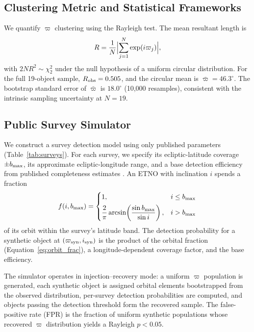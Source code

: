 \documentclass[12pt,a4paper]{article}
\begin{document}
\subsection{Clustering Metric and Statistical Frameworks}

We quantify $\varpi$ clustering using the Rayleigh test. The mean resultant length is
\begin{equation}
R = \frac{1}{N}\Bigl|\sum_{j=1}^{N} \exp(i\varpi_j)\Bigr|,
\label{eq:rayleigh}
\end{equation}
with $2NR^{2} \sim \chi^{2}_{2}$ under the null hypothesis of a uniform circular distribution. For the full 19-object sample, $R_{\rm obs} = 0.505$, and the circular mean is $\bar{\varpi} = 46.3^\circ$. The bootstrap standard error of $\bar{\varpi}$ is $18.0^\circ$ (10,000 resamples), consistent with the intrinsic sampling uncertainty at $N=19$.

\subsection{Public Survey Simulator}

We construct a survey detection model using only published parameters (Table~\ref{tab:surveys}). For each survey, we specify its ecliptic-latitude coverage $\pm b_{\rm max}$, its approximate ecliptic-longitude range, and a base detection efficiency from published completeness estimates \cite{shankman2017,napier2021}. An ETNO with inclination $i$ spends a fraction
\begin{equation}
f(i, b_{\rm max}) = \begin{cases}
1, & i \leq b_{\rm max} \\[4pt]
\displaystyle\frac{2}{\pi}\arcsin\!\left(\frac{\sin b_{\rm max}}{\sin i}\right), & i > b_{\rm max}
\end{cases}
\label{eq:orbit_frac}
\end{equation}
of its orbit within the survey's latitude band. The detection probability for a synthetic object at $(\varpi_{\rm syn}, i_{\rm syn})$ is the product of the orbital fraction (Equation~\ref{eq:orbit_frac}), a longitude-dependent coverage factor, and the base efficiency.

The simulator operates in injection--recovery mode: a uniform $\varpi$ population is generated, each synthetic object is assigned orbital elements bootstrapped from the observed distribution, per-survey detection probabilities are computed, and objects passing the detection threshold form the recovered sample. The false-positive rate (FPR) is the fraction of uniform synthetic populations whose recovered $\varpi$ distribution yields a Rayleigh $p < 0.05$.
\end{document}
